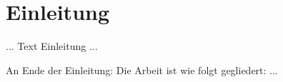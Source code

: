 \chapter{Einleitung}
\label{cha:Einleitung}

... Text Einleitung ...

An Ende der Einleitung: Die Arbeit ist wie folgt gegliedert: ...